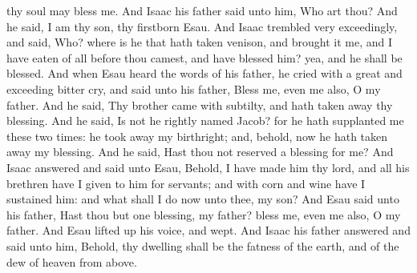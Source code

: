 thy soul may bless me. And Isaac his father said unto him, Who art thou? And he said, I am thy son, thy firstborn Esau. And Isaac trembled very exceedingly, and said, Who? where is he that hath taken venison, and brought it me, and I have eaten of all before thou camest, and have blessed him? yea, and he shall be blessed. And when Esau heard the words of his father, he cried with a great and exceeding bitter cry, and said unto his father, Bless me, even me also, O my father. And he said, Thy brother came with subtilty, and hath taken away thy blessing. And he said, Is not he rightly named Jacob? for he hath supplanted me these two times: he took away my birthright; and, behold, now he hath taken away my blessing. And he said, Hast thou not reserved a blessing for me? And Isaac answered and said unto Esau, Behold, I have made him thy lord, and all his brethren have I given to him for servants; and with corn and wine have I sustained him: and what shall I do now unto thee, my son? And Esau said unto his father, Hast thou but one blessing, my father? bless me, even me also, O my father. And Esau lifted up his voice, and wept. And Isaac his father answered and said unto him, Behold, thy dwelling shall be the fatness of the earth, and of the dew of heaven from above.


